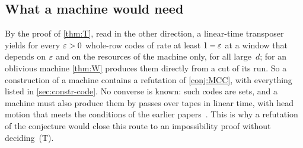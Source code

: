 \subsection{What a machine would need}\label{sec:constr-machine}

By the proof of \cref{thm:T}, read in the other direction, a linear-time transposer yields for every $\varepsilon>0$ whole-row codes of
rate at least $1-\varepsilon$ at a window that depends on $\varepsilon$ and on the resources of the machine only, for all large~$d$;
for an oblivious machine \cref{thm:W} produces them directly from a cut of its run. So a construction of a machine
contains a refutation of \cref{conj:MCC}, with everything listed in \cref{sec:constr-code}. No converse is known:
such codes are sets, and a machine must also produce them by passes over tapes in linear time, with head
motion that meets the conditions of the earlier papers~\cite[Corollary~3.24]{FourthPaper2026}. This is why a
refutation of the conjecture would close this route to an impossibility proof without deciding~(T).
